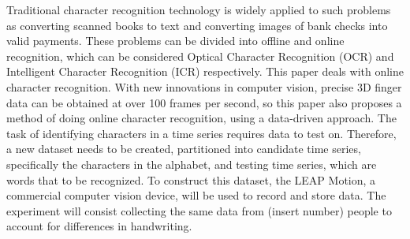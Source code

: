 Traditional character recognition technology is widely applied to such problems as converting scanned books to text and converting images of bank checks into valid payments. These problems can be divided into offline and online recognition, which can be considered Optical Character Recognition (OCR) and Intelligent Character Recognition (ICR) respectively. 
This paper deals with online character recognition. With new innovations in computer vision, precise 3D finger data can be obtained at over 100 frames per second, so this paper also proposes a method of doing online character recognition, using a data-driven approach.
The task of identifying characters in a time series requires data to test on. Therefore, a new dataset needs to be created, partitioned into candidate time series, specifically the characters in the alphabet, and testing time series, which are words that to be recognized. To construct this dataset, the LEAP Motion, a commercial computer vision device, will be used to record and store data. The experiment will consist collecting the same data from  (insert number) people to account for differences in handwriting.

